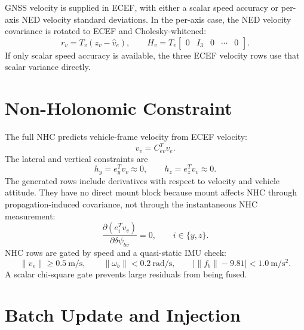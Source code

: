 \documentclass[11pt]{article}
\newcommand{\T}{^{T}}
\begin{document}
GNSS velocity is supplied in ECEF, with either a scalar speed accuracy or
per-axis NED velocity standard deviations. In the per-axis case, the NED
velocity covariance is rotated to ECEF and Cholesky-whitened:
\begin{equation}
  r_v=T_v(z_v-\hat v_e),\qquad H_v=T_v
  \begin{bmatrix}0&I_3&0&\cdots&0\end{bmatrix}.
\end{equation}
If only scalar speed accuracy is available, the three ECEF velocity rows use
that scalar variance directly.

\section{Non-Holonomic Constraint}

The full NHC predicts vehicle-frame velocity from ECEF velocity:
\begin{equation}
  v_v=C_{ev}\T v_e .
\end{equation}
The lateral and vertical constraints are
\begin{equation}
  h_y=e_y\T v_v\approx 0,\qquad
  h_z=e_z\T v_v\approx 0 .
\end{equation}
The generated rows include derivatives with respect to velocity and vehicle
attitude. They have no direct mount block because mount affects NHC through
propagation-induced covariance, not through the instantaneous NHC measurement:
\begin{equation}
  \frac{\partial(e_i\T v_v)}{\partial\delta\psi_{bv}} = 0,\qquad i\in\{y,z\}.
\end{equation}
NHC rows are gated by speed and a quasi-static IMU check:
\begin{equation}
  \|v_e\| \ge 0.5\ \mathrm{m/s},\qquad
  \|\omega_b\|<0.2\ \mathrm{rad/s},\qquad
  \left|\|f_b\|-9.81\right|<1.0\ \mathrm{m/s^2}.
\end{equation}
A scalar chi-square gate prevents large residuals from being fused.

\section{Batch Update and Injection}
\end{document}
